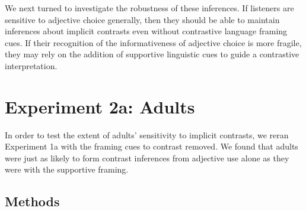 \documentclass[10pt,letterpaper]{article}
\begin{document}
We next turned to investigate the robustness of these inferences.  If listeners are sensitive to adjective choice generally, then they should be able to maintain inferences about implicit contrasts even without contrastive language framing cues.  If their recognition of the informativeness of adjective choice is more fragile, they may rely on the addition of supportive linguistic cues to guide a contrastive interpretation. 




\section{Experiment 2a: Adults} 


In order to test the extent of adults' sensitivity to implicit contrasts, we reran Experiment 1a with the framing cues to contrast removed.  We found that adults were just as likely to form contrast inferences from adjective use alone as they were with the supportive framing. 

\subsection{Methods}
\end{document}
